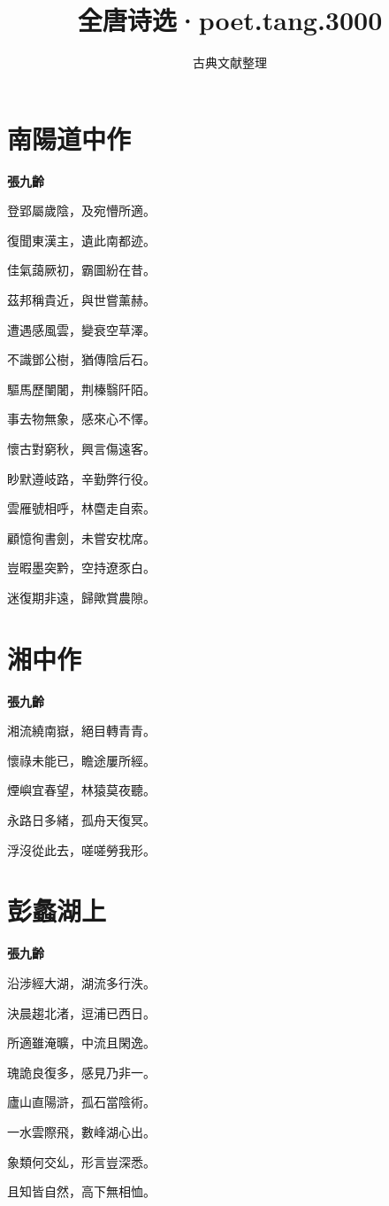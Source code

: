 \documentclass[12pt,a4paper]{ctexbook}
\title{全唐诗选·poet.tang.3000}
\author{古典文献整理}
\date{}
\begin{document}
\maketitle
\tableofcontents
\newpage
\section{南陽道中作}
\textbf{張九齡}\par\vspace{0.5em}
登郢屬歲陰，及宛懵所適。\par
復聞東漢主，遺此南都迹。\par
佳氣藹厥初，霸圖紛在昔。\par
茲邦稱貴近，與世嘗薰赫。\par
遭遇感風雲，變衰空草澤。\par
不識鄧公樹，猶傳陰后石。\par
驅馬歷闉闍，荆榛翳阡陌。\par
事去物無象，感來心不懌。\par
懷古對窮秋，興言傷遠客。\par
眇默遵岐路，辛勤弊行役。\par
雲雁號相呼，林麕走自索。\par
顧憶徇書劍，未嘗安枕席。\par
豈暇墨突黔，空持遼豕白。\par
迷復期非遠，歸歟賞農隙。\par

\section{湘中作}
\textbf{張九齡}\par\vspace{0.5em}
湘流繞南嶽，絕目轉青青。\par
懷祿未能已，瞻途屢所經。\par
煙嶼宜春望，林猿莫夜聽。\par
永路日多緒，孤舟天復冥。\par
浮沒從此去，嗟嗟勞我形。\par

\section{彭蠡湖上}
\textbf{張九齡}\par\vspace{0.5em}
沿涉經大湖，湖流多行泆。\par
決晨趨北渚，逗浦已西日。\par
所適雖淹曠，中流且閑逸。\par
瑰詭良復多，感見乃非一。\par
廬山直陽滸，孤石當陰術。\par
一水雲際飛，數峰湖心出。\par
象類何交乣，形言豈深悉。\par
且知皆自然，高下無相恤。\par
\end{document}

